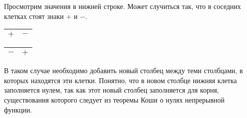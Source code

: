 Просмотрим значения в нижней строке. Может случиться так, что в соседних клетках стоят знаки $+$ и $-$. 
\begin{center}
    \begin{tabular}{|c|c|}
        \hline
        $+$ & $-$\\
        \hline
    \end{tabular}
        \quad
    \begin{tabular}{|c|c|}
        \hline
        $-$ & $+$\\
        \hline
    \end{tabular}            
\end{center}
В таком случае необходимо добавить новый столбец между теми столбцами, в которых находятся эти клетки. Понятно, что в новом столбце нижняя клетка заполняется нулем, так как этот новый столбец заполняется для корня, существования которого следует из теоремы Коши о нулях непрерывной функции. 

